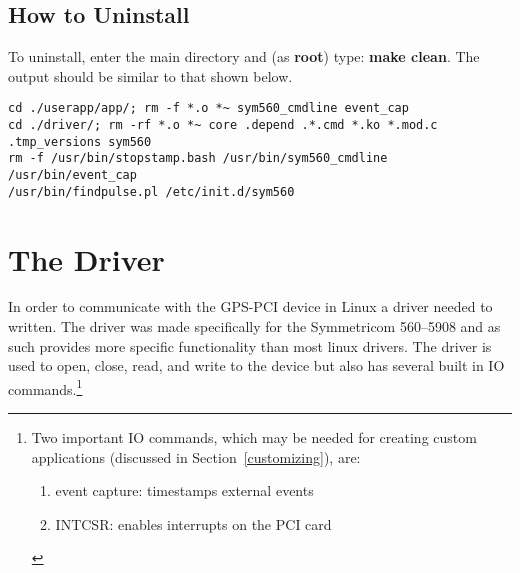 \documentclass[11pt]{article}
\begin{document}
\subsection{How to Uninstall} \label{subsec:uninstall}
To uninstall, enter the main directory and (as \textbf{root}) type: \textbf{make clean}.
 The output should be similar to that shown below.
\begin{footnotesize}
\begin{verbatim}
cd ./userapp/app/; rm -f *.o *~ sym560_cmdline event_cap
cd ./driver/; rm -rf *.o *~ core .depend .*.cmd *.ko *.mod.c .tmp_versions sym560
rm -f /usr/bin/stopstamp.bash /usr/bin/sym560_cmdline /usr/bin/event_cap 
/usr/bin/findpulse.pl /etc/init.d/sym560
\end{verbatim}
\end{footnotesize}



\section{The Driver} \label{sec:driver}

In order to communicate with the GPS-PCI device in Linux a driver needed to written.
 The driver was made specifically for the Symmetricom 560--5908 and as such provides more specific functionality than most linux drivers.  The driver is used to open, close, read, and write to the device but also has several built in IO commands.\footnote{Two important IO commands, which may be needed for creating custom applications (discussed in Section~\ref{customizing}), are:
\begin{enumerate}
 \item event capture: timestamps external events
 \item INTCSR:  enables interrupts on the PCI card
\end{enumerate}
}
\end{document}
